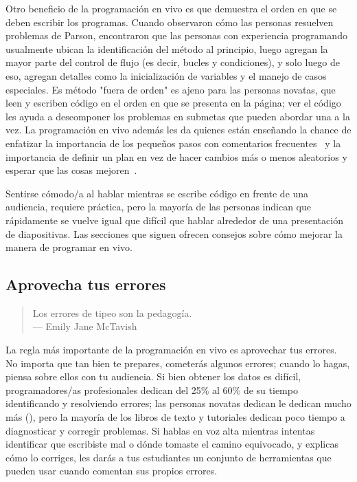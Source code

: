 Otro beneficio de la programación en vivo es que demuestra el orden en que se deben escribir los programas.
Cuando observaron cómo las personas resuelven problemas de Parson,
\cite{Ihan2011} encontraron que las personas con experiencia programando usualmente ubican la identificación del método al principio,
luego agregan la mayor parte del control de flujo (es decir, bucles y condiciones),
y solo luego de eso, agregan detalles como la inicialización de variables y el manejo de casos especiales.
Es método "fuera de orden" es ajeno para las personas novatas,
que leen y escriben código en el orden en que se presenta en la página;
ver el código les ayuda a descomponer los problemas en submetas que pueden abordar una a la vez.
La programación en vivo además les da quienes están enseñando la chance de enfatizar la importancia de los pequeños pasos con comentarios frecuentes~\cite{Blik2014}
y la importancia de definir un plan en vez de hacer 
cambios más o menos aleatorios y esperar que las cosas mejoren~\cite{Spoh1985}.

Sentirse cómodo/a al hablar mientras se escribe código en 
frente de una audiencia, requiere práctica,
pero la mayoría de las personas indican que rápidamente se vuelve igual que difícil que hablar alrededor de una presentación de diapositivas.
Las secciones que siguen ofrecen consejos sobre cómo mejorar la manera de programar en vivo.

\subsection*{Aprovecha tus errores}

\begin{quote}

  Los errores de tipeo son la pedagogía. \\
  --- Emily Jane McTavish

\end{quote}

La regla más importante de la programación en vivo es aprovechar tus errores.
No importa que tan bien te prepares, 
cometerás algunos errores;
cuando lo hagas,
piensa sobre ellos con tu audiencia.
Si bien obtener los datos es difícil,
programadores/as profesionales dedican del 25\% al 60\% de su tiempo identificando y resolviendo errores;
las personas novatas dedican le dedican mucho más (),
pero la mayoría de los libros de texto y tutoriales dedican poco tiempo a diagnosticar y corregir problemas.
Si hablas en voz alta mientras intentas identificar que escribiste mal
o dónde tomaste el camino equivocado,
y explicas cómo lo corriges,
les darás a tus estudiantes un conjunto de herramientas que pueden usar cuando comentan sus propios errores.

